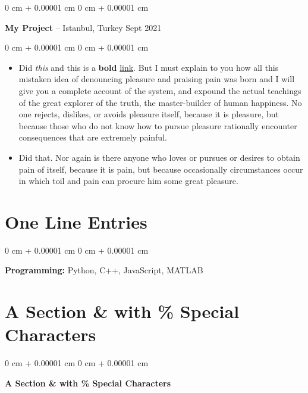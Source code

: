 \documentclass[10pt, letterpaper]{article}
\newenvironment{highlights}{
    \begin{itemize}[
        topsep=0.10 cm,
        parsep=0.10 cm,
        partopsep=0pt,
        itemsep=0pt,
        leftmargin=0 cm + 10pt
    ]
}{
    \end{itemize}
} %
\newenvironment{onecolentry}{
    \begin{adjustwidth}{
        0 cm + 0.00001 cm
    }{
        0 cm + 0.00001 cm
    }
}{
    \end{adjustwidth}
} %
\newenvironment{twocolentry}[2][]{
    \onecolentry
    \def\secondColumn{#2}
    \setcolumnwidth{\fill, 4.5 cm}
    \begin{paracol}{2}
}{
    \switchcolumn \raggedleft \secondColumn
    \end{paracol}
    \endonecolentry
} %
\begin{document}
        \vspace{0.2 cm}

        \begin{twocolentry}{
            Sept 2021
        }
            \textbf{My Project} -- Istanbul, Turkey\end{twocolentry}

        \vspace{0.10 cm}
        \begin{onecolentry}
            \begin{highlights}
                \item Did \textit{this} and this is a \textbf{bold} \href{https://example.com}{link}. But I must explain to you how all this mistaken idea of denouncing pleasure and praising pain was born and I will give you a complete account of the system, and expound the actual teachings of the great explorer of the truth, the master-builder of human happiness. No one rejects, dislikes, or avoids pleasure itself, because it is pleasure, but because those who do not know how to pursue pleasure rationally encounter consequences that are extremely painful.
                \item Did that. Nor again is there anyone who loves or pursues or desires to obtain pain of itself, because it is pain, but because occasionally circumstances occur in which toil and pain can procure him some great pleasure.
            \end{highlights}
        \end{onecolentry}



    
    \section{One Line Entries}



        
        \begin{onecolentry}
            \textbf{Pro\textnormal{gram}ming:} Python, C++, JavaScript, MATLAB
        \end{onecolentry}


    
    \section{A Section \& with \% Special Characters}



        
        \begin{onecolentry}
            \textbf{A Section \& with \% Special Characters}\end{onecolentry}




    
\end{document}
